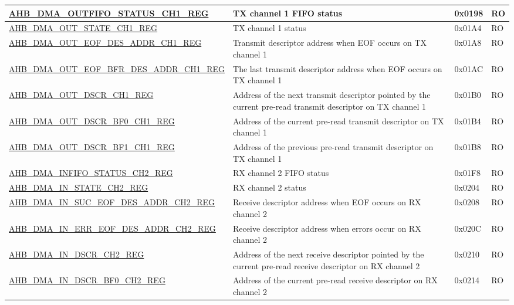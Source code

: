 \begin{longtable}{ | p{8cm} | p{8cm} | p{1.3cm} | p{1.5cm} | }
\hyperref[regdesc:AHBDMAOUTFIFOSTATUSCHNREG]{AHB\_DMA\_OUTFIFO\_STATUS\_CH1\_REG} & TX channel 1 FIFO status & 0x0198 & RO \\ \hline
\hyperref[regdesc:AHBDMAOUTSTATECHNREG]{AHB\_DMA\_OUT\_STATE\_CH1\_REG} & TX channel 1 status & 0x01A4 & RO \\ \hline
\hyperref[regdesc:AHBDMAOUTEOFDESADDRCHNREG]{AHB\_DMA\_OUT\_EOF\_DES\_ADDR\_CH1\_REG} & Transmit descriptor address when EOF occurs on TX channel 1 & 0x01A8 & RO \\ \hline
\hyperref[regdesc:AHBDMAOUTEOFBFRDESADDRCHNREG]{AHB\_DMA\_OUT\_EOF\_BFR\_DES\_ADDR\_CH1\_REG} & The last transmit descriptor address when EOF occurs on TX channel 1 & 0x01AC & RO \\ \hline
\hyperref[regdesc:AHBDMAOUTDSCRCHNREG]{AHB\_DMA\_OUT\_DSCR\_CH1\_REG} & Address of the next transmit descriptor pointed by the current pre-read transmit descriptor on TX channel 1 & 0x01B0 & RO \\ \hline
\hyperref[regdesc:AHBDMAOUTDSCRBF0CHNREG]{AHB\_DMA\_OUT\_DSCR\_BF0\_CH1\_REG} & Address of the current pre-read transmit descriptor on TX channel 1 & 0x01B4 & RO \\ \hline
\hyperref[regdesc:AHBDMAOUTDSCRBF1CHNREG]{AHB\_DMA\_OUT\_DSCR\_BF1\_CH1\_REG} & Address of the previous pre-read transmit descriptor on TX channel 1 & 0x01B8 & RO \\ \hline
\hyperref[regdesc:AHBDMAINFIFOSTATUSCHNREG]{AHB\_DMA\_INFIFO\_STATUS\_CH2\_REG} & RX channel 2 FIFO status & 0x01F8 & RO \\ \hline
\hyperref[regdesc:AHBDMAINSTATECHNREG]{AHB\_DMA\_IN\_STATE\_CH2\_REG} & RX channel 2 status & 0x0204 & RO \\ \hline
\hyperref[regdesc:AHBDMAINSUCEOFDESADDRCHNREG]{AHB\_DMA\_IN\_SUC\_EOF\_DES\_ADDR\_CH2\_REG} & Receive descriptor address when EOF occurs on RX channel 2 & 0x0208 & RO \\ \hline
\hyperref[regdesc:AHBDMAINERREOFDESADDRCHNREG]{AHB\_DMA\_IN\_ERR\_EOF\_DES\_ADDR\_CH2\_REG} & Receive descriptor address when errors occur on RX channel 2 & 0x020C & RO \\ \hline
\hyperref[regdesc:AHBDMAINDSCRCHNREG]{AHB\_DMA\_IN\_DSCR\_CH2\_REG} & Address of the next receive descriptor pointed by the current pre-read receive descriptor on RX channel 2 & 0x0210 & RO \\ \hline
\hyperref[regdesc:AHBDMAINDSCRBF0CHNREG]{AHB\_DMA\_IN\_DSCR\_BF0\_CH2\_REG} & Address of the current pre-read receive descriptor on RX channel 2 & 0x0214 & RO \\ \hline

\end{longtable}
